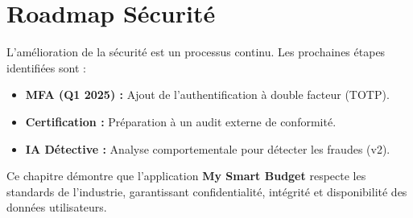 \section{Roadmap Sécurité}

L'amélioration de la sécurité est un processus continu. Les prochaines étapes identifiées sont :

\begin{itemize}
    \item \textbf{MFA (Q1 2025) :} Ajout de l'authentification à double facteur (TOTP).
    \item \textbf{Certification :} Préparation à un audit externe de conformité.
    \item \textbf{IA Détective :} Analyse comportementale pour détecter les fraudes (v2).
\end{itemize}

Ce chapitre démontre que l'application \textbf{My Smart Budget} respecte les standards de l'industrie, garantissant confidentialité, intégrité et disponibilité des données utilisateurs.